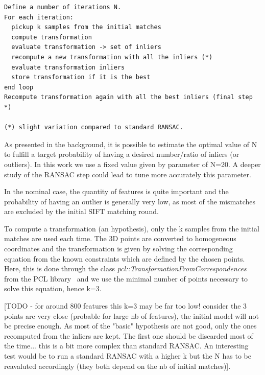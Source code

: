 \begin{verbatim}
Define a number of iterations N.
For each iteration:
  pickup k samples from the initial matches 
  compute transformation
  evaluate transformation -> set of inliers
  recompute a new transformation with all the inliers (*)
  evaluate transformation inliers
  store transformation if it is the best
end loop
Recompute transformation again with all the best inliers (final step *)

(*) slight variation compared to standard RANSAC.
\end{verbatim}

As presented in the background, it is possible to estimate the optimal value of N to fulfill a target probability of having a desired number/ratio of inliers (or outliers). In this work we use a fixed value given by parameter of N=20. A deeper study of the RANSAC step could lead to tune more accurately this parameter.

In the nominal case, the quantity of features is quite important and the probability of having an outlier is generally very low, as most of the mismatches are excluded by the initial SIFT matching round.



To compute a transformation (an hypothesis), only the k samples from the initial matches are used each time. The 3D points are converted to homogeneous coordinates and the transformation is given by solving the corresponding equation from the known constraints which are defined by the chosen points. Here, this is done through the class \emph{pcl::TransformationFromCorrespondences} from the PCL library~\cite{Rusu_ICRA2011_PCL} and we use the minimal number of points necessary to solve this equation, hence k=3.

[TODO - for around 800 features this k=3 may be far too low! consider the 3 points are very close (probable for large nb of features), the initial model will not be precise enough. As most of the "basic" hypothesis are not good, only the ones recomputed from the inliers are kept. The first one should be discarded most of the time... this is a bit more complex than standard RANSAC. An interesting test would be to run a standard RANSAC with a higher k but the N has to be reavaluted accordingly (they both depend on the nb of initial matches)].

